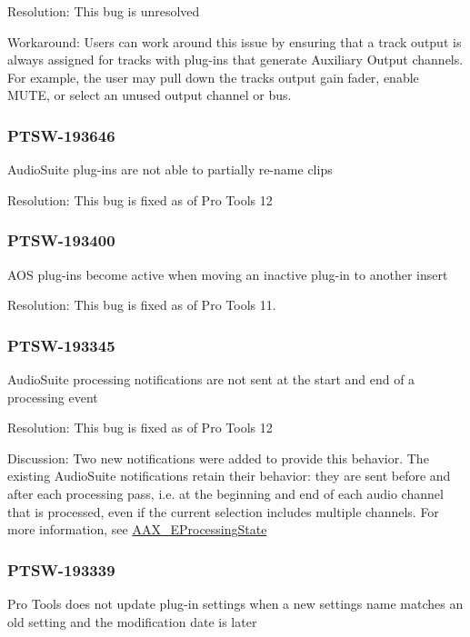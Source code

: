 Resolution\+: This bug is unresolved

Workaround\+: Users can work around this issue by ensuring that a track output is always assigned for tracks with plug-\/ins that generate Auxiliary Output channels. For example, the user may pull down the track\textquotesingle{}s output gain fader, enable M\+U\+T\+E, or select an unused output channel or bus.\hypertarget{a00374_PTSW-193646}{}\subsubsection{P\+T\+S\+W-\/193646}\label{a00374_PTSW-193646}
Audio\+Suite plug-\/ins are not able to partially re-\/name clips

Resolution\+: This bug is fixed as of Pro Tools 12\hypertarget{a00374_PTSW-193400}{}\subsubsection{P\+T\+S\+W-\/193400}\label{a00374_PTSW-193400}
A\+O\+S plug-\/ins become active when moving an inactive plug-\/in to another insert

Resolution\+: This bug is fixed as of Pro Tools 11.\hypertarget{a00374_PTSW-193345}{}\subsubsection{P\+T\+S\+W-\/193345}\label{a00374_PTSW-193345}
Audio\+Suite processing notifications are not sent at the start and end of a processing event

Resolution\+: This bug is fixed as of Pro Tools 12

Discussion\+: Two new notifications were added to provide this behavior. The existing Audio\+Suite notifications retain their behavior\+: they are sent before and after each processing pass, i.\+e. at the beginning and end of each audio channel that is processed, even if the current selection includes multiple channels. For more information, see \hyperlink{a00206_a6ec854be40c8cf810dec97de3e56c0a7}{A\+A\+X\+\_\+\+E\+Processing\+State}\hypertarget{a00374_PTSW-193339}{}\subsubsection{P\+T\+S\+W-\/193339}\label{a00374_PTSW-193339}
Pro Tools does not update plug-\/in settings when a new setting\textquotesingle{}s name matches an old setting and the modification date is later


